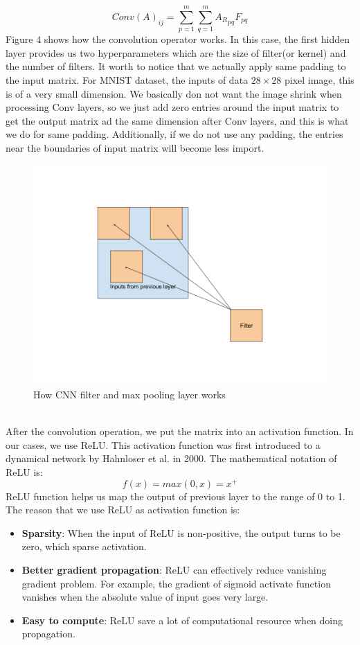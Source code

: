 \documentclass[12pt]{article}
\begin{document}
$$Conv(A)_{ij} = \displaystyle\sum_{p=1}^{m}  \displaystyle\sum_{q=1}^{m} {A_R}_{pq}F_{pq}$$Figure 4 shows how the convolution operator works. In this case, the first hidden layer provides us two hyperparameters which are the size of filter(or kernel) and the number of filters. It worth to notice that we actually apply same padding to the input matrix. For MNIST dataset, the inputs of data $28 \times 28$ pixel image, this is of a very small dimension. We basically don not want the image shrink when processing Conv layers, so we just add zero entries around the input matrix to get the output matrix ad the same dimension after Conv layers, and this is what we do for same padding. Additionally, if we do not  use any padding, the entries near the boundaries of input matrix will become less import.\\
\begin{figure}
\begin{center}
\includegraphics[width =4.7in]{filter.png}
\caption{How CNN filter and max pooling layer works}
\end{center}
\label{fig:pic4}
\end{figure}
~\\
After the convolution operation, we put the matrix into an activation function. In our cases, we use ReLU. This activation function was first introduced to a dynamical network by Hahnloser et al. in 2000. The mathematical notation of ReLU is:
$$f(x) = max(0, x) = x^+$$
ReLU function helps us map the output of previous layer to the range of 0 to 1. The reason that we use ReLU as activation function is:
\begin{itemize}
  \item \textbf{Sparsity}: When the input of ReLU is non-positive, the output turns to be zero, which sparse activation.
  \item \textbf{Better gradient propagation}: ReLU can effectively reduce vanishing gradient problem. For example, the gradient of sigmoid activate function vanishes when the absolute value of input goes very large.
  \item \textbf{Easy to compute}: ReLU save a lot of computational resource when doing propagation.
 \end{itemize}
\end{document}
